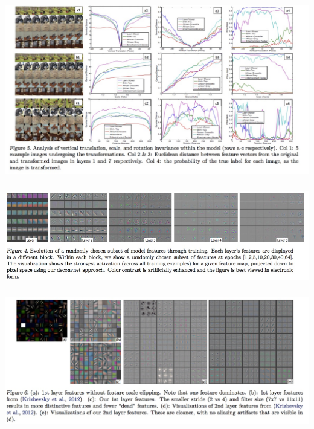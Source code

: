 \documentclass[xetex,mathserif,serif,aspectratio=169]{beamer}
\begin{document}
\begin{frame}[fragile] \frametitle{} \oldB \small

\begin{center}
\includegraphics[width=\textwidth]{img/vizDistort.jpg}
\end{center}

\end{frame}

\begin{frame}[fragile] \frametitle{} \oldB \small

\begin{center}
\includegraphics[width=\textwidth]{img/vizEvolve.jpg}
\end{center}

\end{frame}

\begin{frame}[fragile] \frametitle{} \oldB \small

\begin{center}
\includegraphics[width=\textwidth]{img/vizFeatureClip.jpg}
\end{center}

\end{frame}
\end{document}
